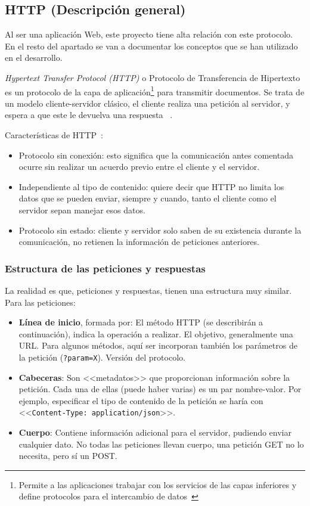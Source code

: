 \subsection{HTTP (Descripción general)}

Al ser una aplicación Web, este proyecto tiene alta relación con este protocolo.
En el resto del apartado se van a documentar los conceptos que se han utilizado
en el desarrollo.

\emph{Hypertext Transfer Protocol (HTTP)} o Protocolo de Transferencia de
Hipertexto es un protocolo de la capa de aplicación\footnote{Permite a las
aplicaciones trabajar con los servicios de las capas inferiores y define
protocolos para el intercambio de datos~\cite{eswiki:149372346}} para transmitir
documentos. Se trata de un modelo cliente-servidor clásico, el cliente realiza
una petición al servidor, y espera a que este le devuelva una respuesta
~\cite{http:mdn}.



Características de HTTP~\cite{http:features}:
\begin{itemize}
	\item Protocolo sin conexión: esto significa que la comunicación antes
	comentada ocurre sin realizar un acuerdo previo entre el cliente y el
	servidor.
	\item Independiente al tipo de contenido: quiere decir que HTTP no limita
	los datos que se pueden enviar, siempre y cuando, tanto el cliente como el
	servidor sepan manejar esos datos.
	\item Protocolo sin estado: cliente y servidor solo saben de su existencia
	durante la comunicación, no retienen la información de peticiones
	anteriores.
\end{itemize}


\subsubsection{Estructura de las peticiones y respuestas}

La realidad es que, peticiones y respuestas, tienen una estructura muy similar. Para las peticiones:
\begin{itemize}
	\item \textbf{Línea de inicio}, formada por:
  \subitem El método HTTP (se describirán a continuación), indica la operación a realizar.
  \subitem El objetivo, generalmente una URL. Para algunos métodos, aquí ser
  incorporan también los parámetros de la petición (\texttt{?param=X}).
  \subitem Versión del protocolo.
	\item \textbf{Cabeceras}: Son <<metadatos>> que proporcionan información sobre la
  petición. Cada una de ellas (puede haber varias) es un par nombre-valor.	Por
  ejemplo, especificar el tipo de contenido de la petición se haría con
  <<\texttt{Content-Type: application/json}>>.
  \item \textbf{Cuerpo}: Contiene información adicional para el servidor, pudiendo enviar
  cualquier dato. No todas las peticiones llevan cuerpo, una petición GET no lo
  necesita, pero sí un POST.
\end{itemize}

